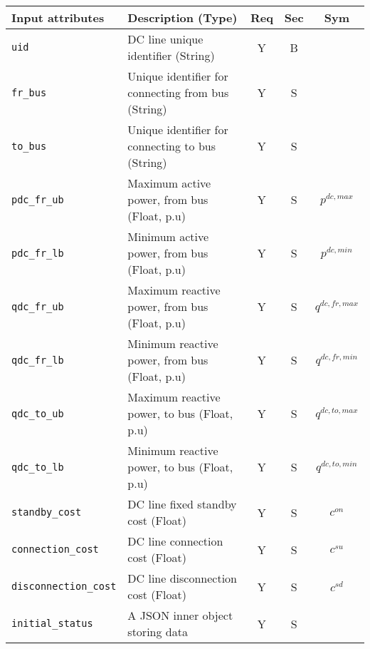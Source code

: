 \documentclass{article}
\begin{document}
\begin{center}
\small
\begin{tabular}{ l | l | c | c | c |}
Input attributes & Description (Type) & Req & Sec & Sym\\
\hline
  {\tt uid} & DC line unique identifier (String)& Y & B &  \\
  {\tt fr\_bus} & Unique identifier for connecting from bus (String) & Y & S & \\
  {\tt to\_bus} & Unique identifier for connecting to bus (String)& Y & S & \\
  {\tt pdc\_fr\_ub} & Maximum active power, from bus (Float, p.u)& Y & S & $p^{dc,max}$\\
  {\tt pdc\_fr\_lb} & Minimum active power, from bus (Float, p.u)& Y & S & $p^{dc,min}$\\
  {\tt qdc\_fr\_ub} & Maximum reactive power, from bus (Float, p.u)& Y & S & $q^{dc,fr,max}$\\
  {\tt qdc\_fr\_lb} & Minimum reactive power, from bus (Float, p.u)& Y & S & $q^{dc,fr,min}$\\
  {\tt qdc\_to\_ub} & Maximum reactive power, to bus (Float, p.u)& Y & S & $q^{dc,to,max}$\\
  {\tt qdc\_to\_lb} & Minimum reactive power, to bus (Float, p.u)& Y & S & $q^{dc,to,min}$\\
   {\tt standby\_cost} & {DC line fixed standby cost (Float)} & Y & S & $c^{on}$\\
  {\tt connection\_cost} & {DC line connection cost (Float)} & Y & S & $c^{su}$\\
  {\tt disconnection\_cost} & {DC line disconnection cost (Float)} & Y & S & $c^{sd}$\\
  {\tt initial\_status} & A JSON inner object storing data  & Y & S &  \\

\end{tabular}
\end{center}
\end{document}
